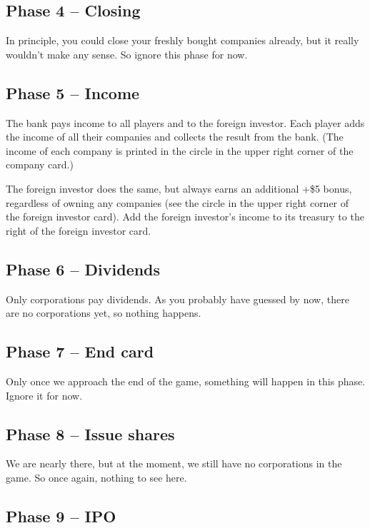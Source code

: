 \documentclass[10pt,final]{report}
\begin{document}
\begin{multicols}{2}
\subsection{Phase 4 -- Closing}

In principle, you could close your freshly bought companies already,
but it really wouldn't make any sense. So ignore this phase for now.

\subsection{Phase 5 -- Income}

The bank pays income to all players and to the foreign investor. Each
player adds the income of all their companies and collects the result
from the bank. (The income of each company is printed in the circle in
the upper right corner of the company card.)

The foreign investor does the same, but always earns an additional
+\$5 bonus, regardless of owning any companies (see the circle in the
upper right corner of the foreign investor card). Add the foreign
investor's income to its treasury to the right of the foreign investor
card.

\subsection{Phase 6 -- Dividends}

Only corporations pay dividends. As you probably have guessed by now,
there are no corporations yet, so nothing happens.

\subsection{Phase 7 -- End card}

Only once we approach the end of the game, something will happen in
this phase. Ignore it for now.

\subsection{Phase 8 -- Issue shares}

We are nearly there, but at the moment, we still have no corporations
in the game. So once again, nothing to see here.

\subsection{Phase 9 -- IPO}


\end{multicols}
\end{document}

